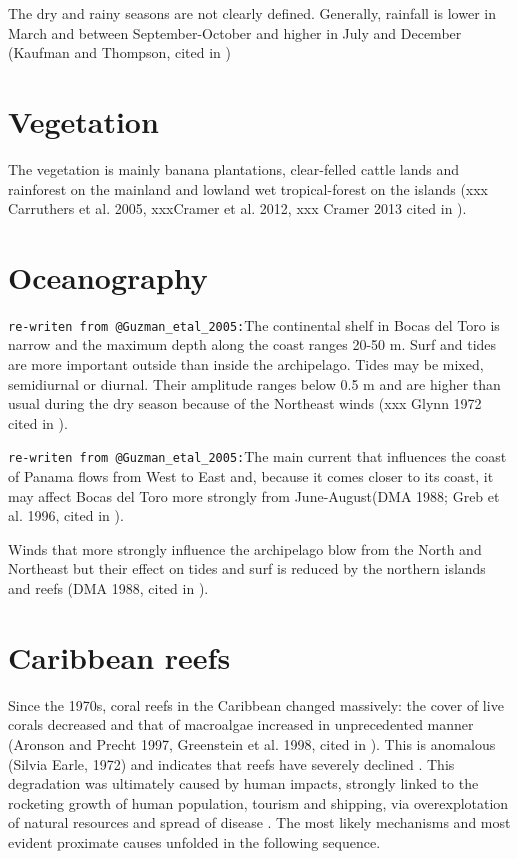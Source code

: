 \documentclass[]{book}
\begin{document}
The dry and rainy seasons are not clearly defined. Generally, rainfall
is lower in March and between September-October and higher in July and
December (Kaufman and Thompson, cited in \citet{Guzman_etal_2005})

\section{Vegetation}\label{vegetation}

The vegetation is mainly banana plantations, clear-felled cattle lands
and rainforest on the mainland and lowland wet tropical-forest on the
islands (xxx Carruthers et al. 2005, xxxCramer et al. 2012, xxx Cramer
2013 cited in \citet{Schloder_etal_2013}).

\section{Oceanography}\label{oceanography}

\texttt{re-writen\ from\ @Guzman\_etal\_2005:}The continental shelf in
Bocas del Toro is narrow and the maximum depth along the coast ranges
20-50 m. Surf and tides are more important outside than inside the
archipelago. Tides may be mixed, semidiurnal or diurnal. Their amplitude
ranges below 0.5 m and are higher than usual during the dry season
because of the Northeast winds (xxx Glynn 1972 cited in
\citet{Guzman_etal_2005}).

\texttt{re-writen\ from\ @Guzman\_etal\_2005:}The main current that
influences the coast of Panama flows from West to East and, because it
comes closer to its coast, it may affect Bocas del Toro more strongly
from June-August(DMA 1988; Greb et al. 1996, cited in
\citet{Guzman_etal_2005}).

Winds that more strongly influence the archipelago blow from the North
and Northeast but their effect on tides and surf is reduced by the
northern islands and reefs (DMA 1988, cited in
\citet{Guzman_etal_2005}).

\section{Caribbean reefs}\label{caribbean-reefs}

Since the 1970s, coral reefs in the Caribbean changed massively: the
cover of live corals decreased and that of macroalgae increased in
unprecedented manner \citep{Jackson_etal_2014}(Aronson and Precht 1997,
Greenstein et al. 1998, cited in \citet{Fredston_etal_2013}). This is
anomalous (Silvia Earle, 1972) and indicates that reefs have severely
declined \citep{Jackson_etal_2014}. This degradation was ultimately
caused by human impacts, strongly linked to the rocketing growth of
human population, tourism and shipping, via overexplotation of natural
resources and spread of disease \citep{Jackson_etal_2014}. The most
likely mechanisms and most evident proximate causes unfolded in the
following sequence.
\end{document}
